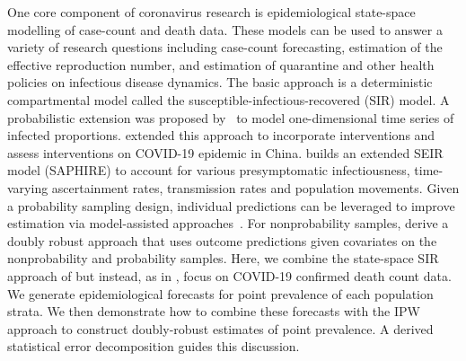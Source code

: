 \documentclass[11pt]{amsart}
\numberwithin{equation}{section}
\theoremstyle{plain}
\begin{document}
One core component of coronavirus research is epidemiological state-space modelling of case-count and death data. These models can be used to answer a variety of research questions including case-count forecasting, estimation of the effective reproduction number, and estimation of quarantine and other health policies on infectious disease dynamics.  The basic approach is a deterministic compartmental model called the susceptible-infectious-recovered (SIR) model.  A probabilistic extension was proposed by~\cite{Osthus2017} to model one-dimensional time series of infected proportions. \cite{Song2020} extended this approach to incorporate interventions and assess interventions on COVID-19 epidemic in China. \cite{Hao2020} builds an extended SEIR model (SAPHIRE) to account for various presymptomatic infectiousness, time-varying ascertainment rates, transmission rates and population movements. Given a probability sampling design, individual predictions can be leveraged to improve estimation via model-assisted approaches~\citep{Breidt2017}.  For nonprobability samples, \cite{Chen2019} derive a doubly robust approach that uses outcome predictions given covariates on the nonprobability and probability samples.  Here, we combine the state-space SIR approach of \cite{Song2020} but instead, as in \cite{Johndrow2020}, focus on COVID-19 confirmed death count data.  We generate epidemiological forecasts for point prevalence of each population strata.  We then demonstrate how to combine these forecasts with the IPW approach to construct doubly-robust estimates of point prevalence.  A derived statistical error decomposition guides this discussion.




\end{document}
